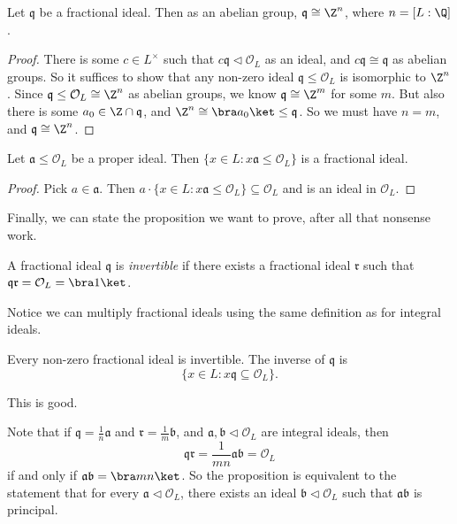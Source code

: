 \documentclass[a4paper]{article}
\begin{document}
\begin{cor}
  Let $\mathfrak{q}$ be a fractional ideal. Then as an abelian group, $\mathfrak{q} \cong \Z^n$, where $n = [L:\Q]$.
\end{cor}

\begin{proof}
  There is some $c \in L^\times$ such that $c\mathfrak{q} \lhd \mathcal{O}_L$ as an ideal, and $c\mathfrak{q} \cong \mathfrak{q}$ as abelian groups. So it suffices to show that any non-zero ideal $\mathfrak{q} \leq \mathcal{O}_L$ is isomorphic to $\Z^n$. Since $\mathfrak{q} \leq \mathcal{O}_L \cong \Z^n$ as abelian groups, we know $\mathfrak{q} \cong \Z^m$ for some $m$. But also there is some $a_0 \in \Z \cap \mathfrak{q}$, and $\Z^n \cong \bra a_0\ket \leq \mathfrak{q}$. So we must have $n = m$, and $\mathfrak{q} \cong \Z^n$.
\end{proof}

\begin{cor}
  Let $\mathfrak{a} \leq \mathcal{O}_L$ be a proper ideal. Then $\{x \in L: x\mathfrak{a} \leq \mathcal{O}_L\}$ is a fractional ideal.
\end{cor}

\begin{proof}
  Pick $a \in \mathfrak{a}$. Then $a \cdot \{x \in L: x\mathfrak{a} \leq \mathcal{O}_L\} \subseteq \mathcal{O}_L$ and is an ideal in $\mathcal{O}_L$.
\end{proof}
Finally, we can state the proposition we want to prove, after all that nonsense work.

\begin{defi}
  A fractional ideal $\mathfrak{q}$ is \emph{invertible} if there exists a fractional ideal $\mathfrak{r}$ such that $\mathfrak{q}\mathfrak{r} = \mathcal{O}_L = \bra 1\ket$.
\end{defi}
Notice we can multiply fractional ideals using the same definition as for integral ideals.

\begin{prop}
  Every non-zero fractional ideal is invertible. The inverse of $\mathfrak{q}$ is
  \[
    \{x \in L: x\mathfrak{q} \subseteq \mathcal{O}_L\}.
  \]
\end{prop}
This is good.

Note that if $\mathfrak{q} = \frac{1}{n} \mathfrak{a}$ and $\mathfrak{r} = \frac{1}{m} \mathfrak{b}$, and $\mathfrak{a}, \mathfrak{b} \lhd \mathcal{O}_L$ are integral ideals, then
\[
  \mathfrak{q} \mathfrak{r} = \frac{1}{mn} \mathfrak{a}\mathfrak{b} = \mathcal{O}_L
\]
if and only if $\mathfrak{a}\mathfrak{b} = \bra mn\ket$. So the proposition is equivalent to the statement that for every $\mathfrak{a} \lhd \mathcal{O}_L$, there exists an ideal $\mathfrak{b} \lhd \mathcal{O}_L$ such that $\mathfrak{a}\mathfrak{b}$ is principal.
\end{document}
